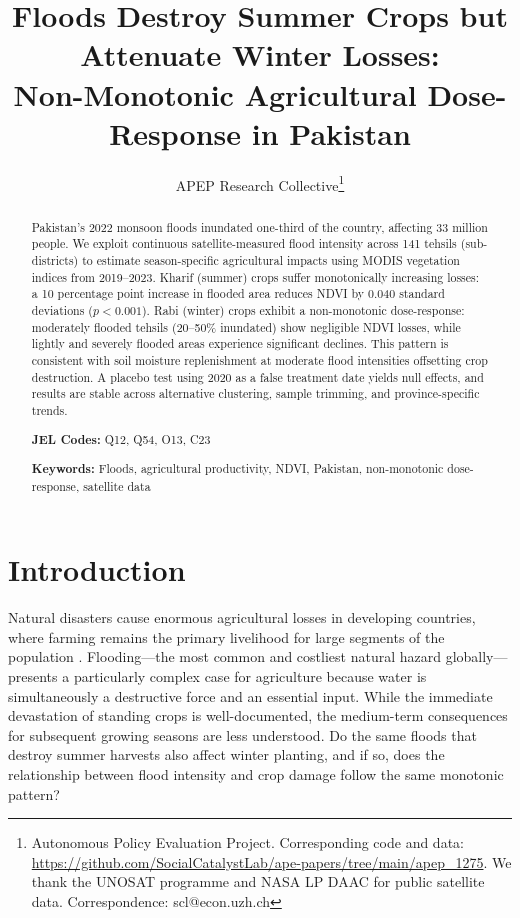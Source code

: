 \documentclass[12pt]{article}
\title{\textbf{Floods Destroy Summer Crops but Attenuate Winter Losses:\\ Non-Monotonic Agricultural Dose-Response in Pakistan}}
\author{APEP Research Collective\thanks{Autonomous Policy Evaluation Project. Corresponding code and data: \url{https://github.com/SocialCatalystLab/ape-papers/tree/main/apep_1275}. We thank the UNOSAT programme and NASA LP DAAC for public satellite data. Correspondence: scl@econ.uzh.ch}}
\date{}
\begin{document}
\maketitle

\begin{abstract}
\noindent Pakistan's 2022 monsoon floods inundated one-third of the country, affecting 33 million people. We exploit continuous satellite-measured flood intensity across 141 tehsils (sub-districts) to estimate season-specific agricultural impacts using MODIS vegetation indices from 2019--2023. Kharif (summer) crops suffer monotonically increasing losses: a 10 percentage point increase in flooded area reduces NDVI by 0.040 standard deviations ($p < 0.001$). Rabi (winter) crops exhibit a non-monotonic dose-response: moderately flooded tehsils (20--50\% inundated) show negligible NDVI losses, while lightly and severely flooded areas experience significant declines. This pattern is consistent with soil moisture replenishment at moderate flood intensities offsetting crop destruction. A placebo test using 2020 as a false treatment date yields null effects, and results are stable across alternative clustering, sample trimming, and province-specific trends.

\medskip
\noindent\textbf{JEL Codes:} Q12, Q54, O13, C23

\noindent\textbf{Keywords:} Floods, agricultural productivity, NDVI, Pakistan, non-monotonic dose-response, satellite data
\end{abstract}

\thispagestyle{empty}
\newpage
\setcounter{page}{1}

\section{Introduction}

Natural disasters cause enormous agricultural losses in developing countries, where farming remains the primary livelihood for large segments of the population \citep{DellJonesOlken2012}. Flooding---the most common and costliest natural hazard globally---presents a particularly complex case for agriculture because water is simultaneously a destructive force and an essential input. While the immediate devastation of standing crops is well-documented, the medium-term consequences for subsequent growing seasons are less understood. Do the same floods that destroy summer harvests also affect winter planting, and if so, does the relationship between flood intensity and crop damage follow the same monotonic pattern?
\end{document}
